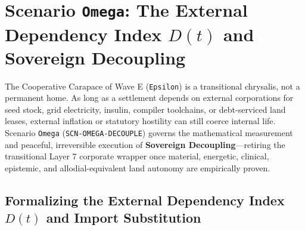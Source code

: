 \section{Scenario \texttt{Omega}: The External Dependency Index $D(t)$ and Sovereign Decoupling}
\label{sec:scn-omega}

The Cooperative Carapace of Wave E (\texttt{Epsilon}) is a transitional chrysalis, not a permanent home. As long as a settlement depends on external
corporations for seed stock, grid electricity, insulin, compiler toolchains, or debt-serviced land leases, external inflation or statutory hostility can
still coerce internal life. Scenario \texttt{Omega} (\texttt{SCN-OMEGA-DECOUPLE}) governs the mathematical measurement and peaceful, irreversible
execution of \textbf{Sovereign Decoupling}---retiring the transitional Layer 7 corporate wrapper once material, energetic, clinical, epistemic, and
allodial-equivalent land autonomy are empirically proven.

\subsection{Formalizing the External Dependency Index $D(t)$ and Import Substitution}

